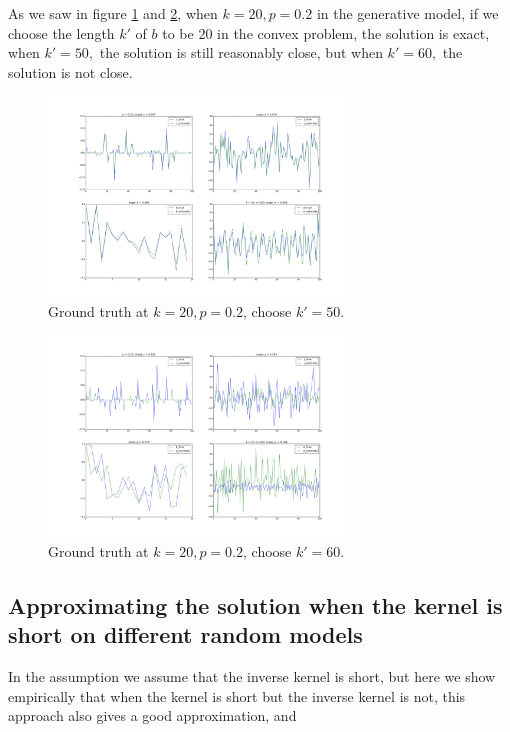\documentclass[letter, 10pt]{article}
\numberwithin{equation}{section}
\begin{document}
As we saw in figure \ref{fig:8} and \ref{fig:9}, when $k=20, p=0.2$ in the generative model, if we choose the length $k'$ of $b$ to be $20$ in the convex problem, the solution is exact, when $k'= 50,$ the solution is still reasonably close, but when $k'= 60,$ the solution is not close.
\begin{figure}
\centering 
\label{fig:8}
\includegraphics[width=8cm,keepaspectratio]{fig2/03_bShort_wronglen_xSparse_w_Gaus_AGauss_n100_k20_p0_20_sigma0_00.png}
\caption{Ground truth at $k=20, p=0.2$, choose $k'= 50$. }
\end{figure}

\begin{figure}
\centering 
\label{fig:9}
 \includegraphics[width=8cm,keepaspectratio]{fig2/03_bShort_k_60_len_xSparse_w_Gaus_AGauss_n100_k20_p0_20_sigma0_00.png}
\caption{Ground truth at $k=20, p=0.2$, choose $k'= 60$. }
\end{figure}
\subsection{Approximating the solution when the kernel is short on different random models}
In the assumption we assume that the inverse kernel is short, but here we show empirically that when the kernel is short but the inverse kernel is not, this approach also gives a good approximation, and  
\end{document}
